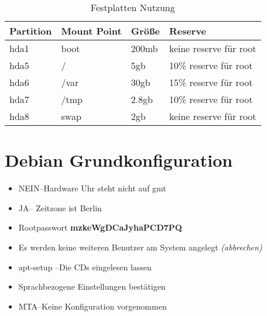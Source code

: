 \begin{table}[htbp]
\begin{center}
\begin{tabular*}{0.95\textwidth}{p{}p{}p{}p{}}
\hline
\textbf{Partition} & \textbf{Mount Point} & \textbf{Größe} & \textbf{Reserve} \\
\hline
hda1 & boot & 200mb & keine reserve für root \\
hda5 & / & 5gb & 10\%  reserve für root \\
hda6 & /var & 30gb & 15\%  reserve für root \\
hda7 & /tmp & 2.8gb & 10\%  reserve für root \\
hda8 & swap & 2gb & keine reserve für root \\
\hline
\end{tabular*}
\caption{Festplatten Nutzung}
\label{table:Festplatten Nutzung}
\end{center}
\end{table}


\section{Debian Grundkonfiguration}
\label{section:Debian Grundkonfiguration}

\begin{itemize}
\item \glqq NEIN\grqq --Hardware Uhr steht nicht auf gmt
\item \glqq JA\grqq -- Zeitzone ist Berlin
\item Rootpasswort \textbf{mzkeWgDCaJyhaPCD7PQ}
\item Es werden keine weiteren Benutzer am System angelegt \textit{(abbrechen)}
\item apt-setup   --Die CDs eingelesen lassen
\item Sprachbezogene Einstellungen bestätigen
\item \glqq MTA\grqq  --Keine Konfiguration vorgenommen 
\end{itemize}
